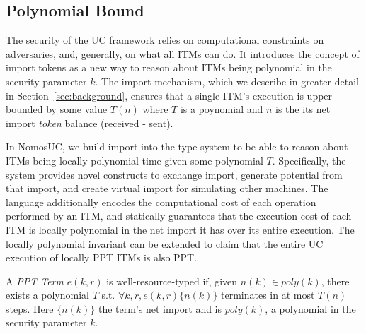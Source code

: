\subsection{Polynomial Bound}
The security of the UC framework relies on computational constraints on adversaries, and, generally, on what all ITMs can do.
It introduces the concept of import tokens as a new way to reason about ITMs being polynomial in the security parameter $k$. 
The import mechanism, which we describe in greater detail in Section~\ref{sec:background}, ensures that a single ITM's execution is upper-bounded by some value $T(n)$ where $T$ is a poynomial and $n$ is the its net import \emph{token} balance (received - sent).

In NomosUC, we build import into the type system to be able to reason about ITMs being locally polynomial time given some polynomial $T$.
Specifically, the system provides novel constructs to exchange import, generate potential from that import, and create virtual import for simulating other machines.
The language additionally encodes the computational cost of each operation performed by an ITM, and statically guarantees that the execution cost of each ITM is locally polynomial in the net import it has over its entire execution. 
The locally polynomial invariant can be extended to claim that the entire UC execution of locally PPT ITMs is also PPT.

\begin{ddef}[PPT in $k$]\label{def:ppt}
A \textit{PPT Term} $e(k, r)$ is well-resource-typed if, given $n(k) \in poly(k)$, there exists a polynomial $T$ s.t. $\forall k, r, e(k, r) \{n(k)\}$  terminates in at most $T(n)$ steps. Here $\{n(k)\}$ the term's net import and is $poly(k)$, a polynomial in the security parameter $k$.
\end{ddef}


